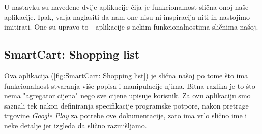     U nastavku su navedene dvije aplikacije čija je funkcionalnost slična onoj naše aplikacije. Ipak, valja naglasiti da nam one nisu ni inspiracija niti ih nastojimo imitirati. One su upravo to - aplikacije s nekim funkcionalnostima sličnima našoj.
    
    \subsection{SmartCart: Shopping list}
    
    Ova aplikacija (\ref{fig:SmartCart: Shopping list}) je slična našoj po tome što ima funkcionalnost stvaranja više popisa i manipulacije njima. Bitna razlika je to što nema "agregator cijena" nego sve cijene upisuje korisnik. Za ovu aplikaciju smo saznali tek nakon definiranja specifikacije programske potpore, nakon pretrage trgovine \textit{Google Play} za potrebe ove dokumentacije, zato ima vrlo slično ime i neke detalje jer izgleda da slično razmišljamo.
    
